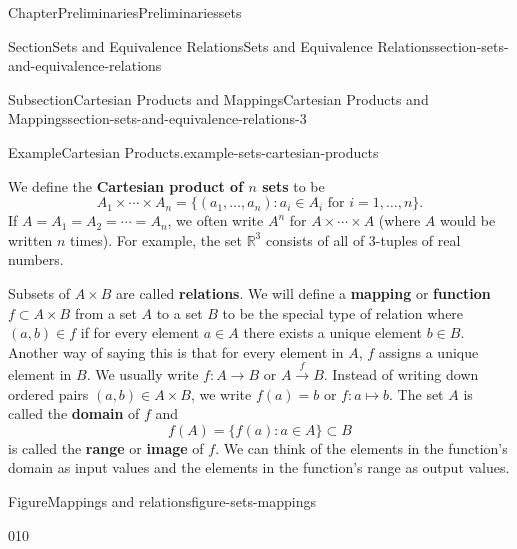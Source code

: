 \documentclass[oneside,10pt,]{book}
\newcommand{\terminology}[1]{\textbf{#1}}
\numberwithin{equation}{section}
\begin{document}
\begin{chapterptx}{Chapter}{Preliminaries}{}{Preliminaries}{}{}{sets}
\begin{sectionptx}{Section}{Sets and Equivalence Relations}{}{Sets and Equivalence Relations}{}{}{section-sets-and-equivalence-relations}
\begin{subsectionptx}{Subsection}{Cartesian Products and Mappings}{}{Cartesian Products and Mappings}{}{}{section-sets-and-equivalence-relations-3}
\begin{example}{Example}{Cartesian Products.}{example-sets-cartesian-products}
%
\end{example}
We define the \terminology{Cartesian product of \(n\) sets} to be%
\begin{equation*}
A_1 \times \cdots \times A_n = \{ (a_1, \ldots, a_n): a_i \in A_i \text{ for } i = 1, \ldots, n \}\text{.}
\end{equation*}
If \(A = A_1 = A_2 = \cdots = A_n\), we often write \(A^n\) for \(A \times \cdots \times A\) (where \(A\) would be written \(n\) times).  \label{section-sets-and-equivalence-relations-3-4-8}For example, the set \({\mathbb R}^3\) consists of all of 3-tuples of real numbers.%
\par
Subsets of \(A \times B\) are called \terminology{relations}.  We will define a  \terminology{mapping} or \terminology{function} \(f \subset A \times B\) from a set \(A\) to a set \(B\) to be the special type of relation where \((a, b) \in f\) if for every element \(a \in A\) there exists a unique element \(b \in B\). Another way of saying this is that for every element in \(A\), \(f\) assigns a unique element in \(B\).  We usually write \(f:A \rightarrow B\) or \(A \stackrel{f}{\rightarrow} B\).  Instead of writing down ordered pairs  \((a,b) \in A \times B\), we write \(f(a) = b\) or \(f : a \mapsto b\).  The set  \(A\) is called the \terminology{domain} of \(f\) and%
\begin{equation*}
f(A) = \{ f(a) : a \in A \} \subset B
\end{equation*}
is called the \terminology{range} or \terminology{image} of \(f\).  We can think of the elements in the function's domain as input values and the elements in the function's range as output values.%
\begin{figureptx}{Figure}{Mappings and relations}{figure-sets-mappings}{}%
\begin{image}{0}{1}{0}{}%
\end{image}
\end{figureptx}
\end{subsectionptx}
\end{sectionptx}
\end{chapterptx}
\end{document}
